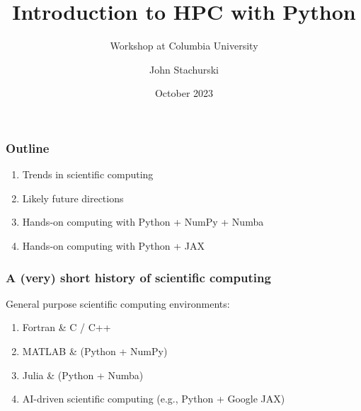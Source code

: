 \documentclass[
    xcolor={svgnames,dvipsnames},
    hyperref={colorlinks, citecolor=DeepPink4, linkcolor=DarkRed, urlcolor=DarkBlue}
    ]{beamer}  %
\title{Introduction to HPC with Python}
\subtitle{Workshop at Columbia University}
\author{John Stachurski}
\date{October 2023}
\newcommand{\1}{\mathbbm 1}
\begin{document}
\begin{frame}
  \titlepage
\end{frame}







\begin{frame}
    \frametitle{Outline}

    \begin{enumerate}
        \item Trends in scientific computing
        \vspace{0.5em}
        \vspace{0.5em}
        \item Likely future directions
        \vspace{0.5em}
        \vspace{0.5em}
        \item Hands-on computing with Python + NumPy + Numba 
        \vspace{0.5em}
        \vspace{0.5em}
        \item Hands-on computing with Python + JAX
    \end{enumerate}

\end{frame}



\begin{frame}
    \frametitle{A (very) short history of scientific computing}


    General purpose scientific computing environments:

        \vspace{0.5em}
        \vspace{0.5em}
    \begin{enumerate}
        \item Fortran \& C / C++ 
        \vspace{0.5em}
        \vspace{0.5em}
        \item MATLAB \& (Python + NumPy)
        \vspace{0.5em}
        \vspace{0.5em}
        \item Julia \& (Python + Numba) 
        \vspace{0.5em}
        \vspace{0.5em}
        \item AI-driven scientific computing (e.g., Python + Google JAX)
    \end{enumerate}

\end{frame}
\end{document}
